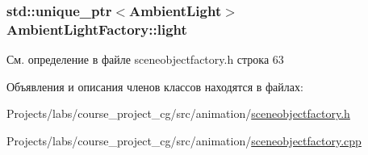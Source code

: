 \subsubsection[{\texorpdfstring{light}{light}}]{\setlength{\rightskip}{0pt plus 5cm}std\+::unique\+\_\+ptr$<${\bf Ambient\+Light}$>$ Ambient\+Light\+Factory\+::light\hspace{0.3cm}{\ttfamily [private]}}\hypertarget{class_ambient_light_factory_a221bc9ca33216eece4eb9878444dbb94}{}\label{class_ambient_light_factory_a221bc9ca33216eece4eb9878444dbb94}


См. определение в файле sceneobjectfactory.\+h строка 63



Объявления и описания членов классов находятся в файлах\+:\begin{DoxyCompactItemize}
\item 
Projects/labs/course\+\_\+project\+\_\+cg/src/animation/\hyperlink{sceneobjectfactory_8h}{sceneobjectfactory.\+h}\item 
Projects/labs/course\+\_\+project\+\_\+cg/src/animation/\hyperlink{sceneobjectfactory_8cpp}{sceneobjectfactory.\+cpp}\end{DoxyCompactItemize}
